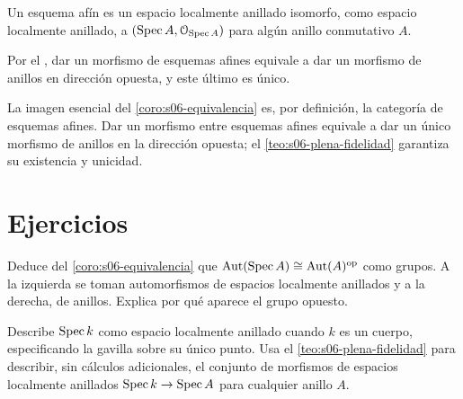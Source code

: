 \begin{defi}
\label{defi:s06-esquema-afin}
Un esquema afín es un espacio localmente anillado isomorfo, como espacio localmente anillado, a $(\operatorname{Spec} A,\mathcal O_{\operatorname{Spec} A})$ para algún anillo conmutativo $A$.
\end{defi}

Por el , dar un morfismo de esquemas afines equivale a dar un morfismo de anillos en dirección opuesta, y este último es único.

\begin{obs}
\label{obs:s06-imagen-esencial-corolario-5-1}
La imagen esencial del \cref{coro:s06-equivalencia} es, por definición, la categoría de esquemas afines. Dar un morfismo entre esquemas afines equivale a dar un único morfismo de anillos en la dirección opuesta; el \cref{teo:s06-plena-fidelidad} garantiza su existencia y unicidad.
\end{obs}

\section{Ejercicios}

\begin{ejer}[Automorfismos]
\label{ejer:s06-automorfismos}
Deduce del \cref{coro:s06-equivalencia} que $\operatorname{Aut}(\operatorname{Spec} A)\cong\operatorname{Aut}(A)^{\mathrm{op}}$ como grupos. A la izquierda se toman automorfismos de espacios localmente anillados y a la derecha, de anillos. Explica por qué aparece el grupo opuesto.
\end{ejer}
\begin{ejer}
\label{ejer:s06-caso-pequeno}
Describe $\operatorname{Spec} k$ como espacio localmente anillado cuando $k$ es un cuerpo, especificando la gavilla sobre su único punto. Usa el \cref{teo:s06-plena-fidelidad} para describir, sin cálculos adicionales, el conjunto de morfismos de espacios localmente anillados $\operatorname{Spec} k\to\operatorname{Spec} A$ para cualquier anillo $A$.
\end{ejer}
